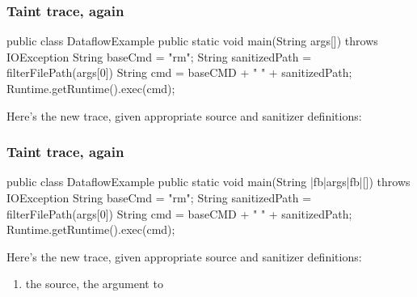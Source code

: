 \documentclass[aspectratio=169, handout]{beamer}
\begin{document}
\begin{frame}[fragile]
  \frametitle{Taint trace, again}

  \begin{minipage}[t][1.8in][t]{\textwidth}
    \begin{pythoncodeblock}[language=java]
      public class DataflowExample {
        public static void main(String args[]) throws IOException {
          String baseCmd = "rm";
          String sanitizedPath = filterFilePath(args[0])
          String cmd = baseCMD + " " + sanitizedPath;
          Runtime.getRuntime().exec(cmd);
        }
      }
    \end{pythoncodeblock}
  \end{minipage}
  \begin{minipage}[t][1in][t]{\textwidth}
    Here's the new trace, given appropriate source and sanitizer definitions:
  \end{minipage}
\end{frame}


\begin{frame}[fragile]
  \frametitle{Taint trace, again}

  \begin{minipage}[t][1.8in][t]{\textwidth}
    \begin{pythoncodeblock}[language=java]
      public class DataflowExample {
        public static void main(String |fb|args|fb|[]) throws IOException {
          String baseCmd = "rm";
          String sanitizedPath = filterFilePath(args[0])
          String cmd = baseCMD + " " + sanitizedPath;
          Runtime.getRuntime().exec(cmd);
        }
      }
    \end{pythoncodeblock}
  \end{minipage}
  \begin{minipage}[t][1in][t]{\textwidth}
    Here's the new trace, given appropriate source and sanitizer definitions:
    \begin{enumerate}
      \item the {\color{sourceColor}source}, the  argument to 
    \end{enumerate}
  \end{minipage}
\end{frame}
\end{document}
